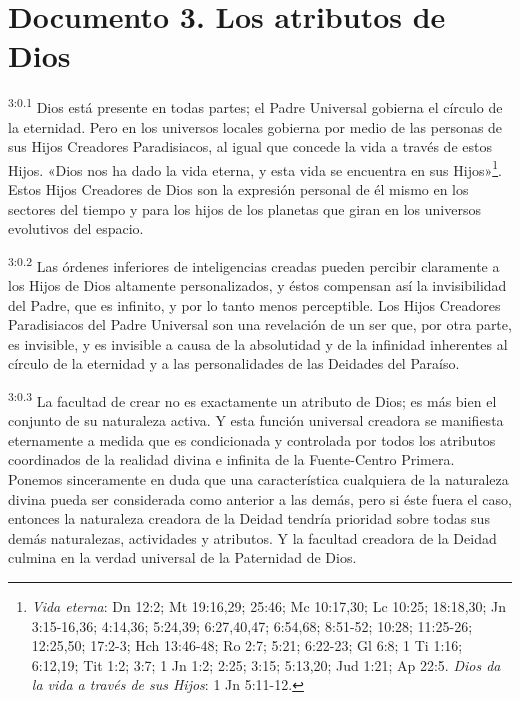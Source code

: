 \chapter{Documento 3. Los atributos de Dios}
\par
\textsuperscript{3:0.1} Dios está presente en todas partes; el Padre Universal gobierna el círculo de la eternidad. Pero en los universos locales gobierna por medio de las personas de sus Hijos Creadores Paradisiacos, al igual que concede la vida a través de estos Hijos. «Dios nos ha dado la vida eterna, y esta vida se encuentra en sus Hijos»\footnote{\textit{Vida eterna}: Dn 12:2; Mt 19:16,29; 25:46; Mc 10:17,30; Lc 10:25; 18:18,30; Jn 3:15-16,36; 4:14,36; 5:24,39; 6:27,40,47; 6:54,68; 8:51-52; 10:28; 11:25-26; 12:25,50; 17:2-3; Hch 13:46-48; Ro 2:7; 5:21; 6:22-23; Gl 6:8; 1 Ti 1:16; 6:12,19; Tit 1:2; 3:7; 1 Jn 1:2; 2:25; 3:15; 5:13,20; Jud 1:21; Ap 22:5. \textit{Dios da la vida a través de sus Hijos}: 1 Jn 5:11-12.}. Estos Hijos Creadores de Dios son la expresión personal de él mismo en los sectores del tiempo y para los hijos de los planetas que giran en los universos evolutivos del espacio.

\par
\textsuperscript{3:0.2} Las órdenes inferiores de inteligencias creadas pueden percibir claramente a los Hijos de Dios altamente personalizados, y éstos compensan así la invisibilidad del Padre, que es infinito, y por lo tanto menos perceptible. Los Hijos Creadores Paradisiacos del Padre Universal son una revelación de un ser que, por otra parte, es invisible, y es invisible a causa de la absolutidad y de la infinidad inherentes al círculo de la eternidad y a las personalidades de las Deidades del Paraíso.

\par
\textsuperscript{3:0.3} La facultad de crear no es exactamente un atributo de Dios; es más bien el conjunto de su naturaleza activa. Y esta función universal creadora se manifiesta eternamente a medida que es condicionada y controlada por todos los atributos coordinados de la realidad divina e infinita de la Fuente-Centro Primera. Ponemos sinceramente en duda que una característica cualquiera de la naturaleza divina pueda ser considerada como anterior a las demás, pero si éste fuera el caso, entonces la naturaleza creadora de la Deidad tendría prioridad sobre todas sus demás naturalezas, actividades y atributos. Y la facultad creadora de la Deidad culmina en la verdad universal de la Paternidad de Dios.

